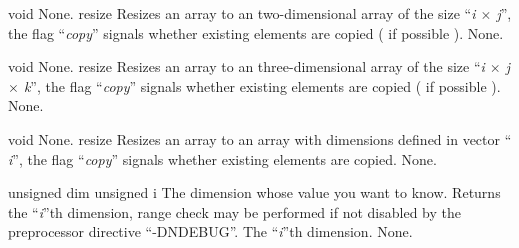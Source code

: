 \setNormalInstance
\setCorrectWidthThree{8pt}
\printMethodWithParamsSaved
{void}
{None.}
{resize}
{Resizes an array to an two-dimensional array of the size ``{\em i $\times$
j}'', the
flag ``{\em copy}'' signals whether existing elements are copied ( if
possible ).}
{None.}
\setCorrectWidthThree{4pt}

\clearpage

\setNormalInstance
\setCorrectWidthThree{8pt}
\printMethodWithParamsSaved
{void}
{None.}
{resize}
{Resizes an array to an three-dimensional array of the size ``{\em i $\times$
j $\times$ k}'', the flag ``{\em copy}'' signals whether existing elements
are copied ( if possible ).}
{None.}
\setCorrectWidthThree{4pt}

\setNormalInstance
\setCorrectWidthThree{8pt}
\printMethodWithParamsSaved
{void}
{None.}
{resize}
{Resizes an array to an array with dimensions defined in vector ``{\em
i}'',
the flag ``{\em copy}'' signals whether existing elements are copied.}
{None.}
\setCorrectWidthThree{4pt}

\setNormalInstance
\printMethodWithOneParam
{unsigned}
{dim}
{unsigned}
{i}
{The dimension whose value you want to know.}
{Returns the ``{\em i}''th dimension, range check may be performed if not
disabled by the preprocessor directive ``-DNDEBUG''.}
{The ``{\em i}''th dimension.}
{None.}

